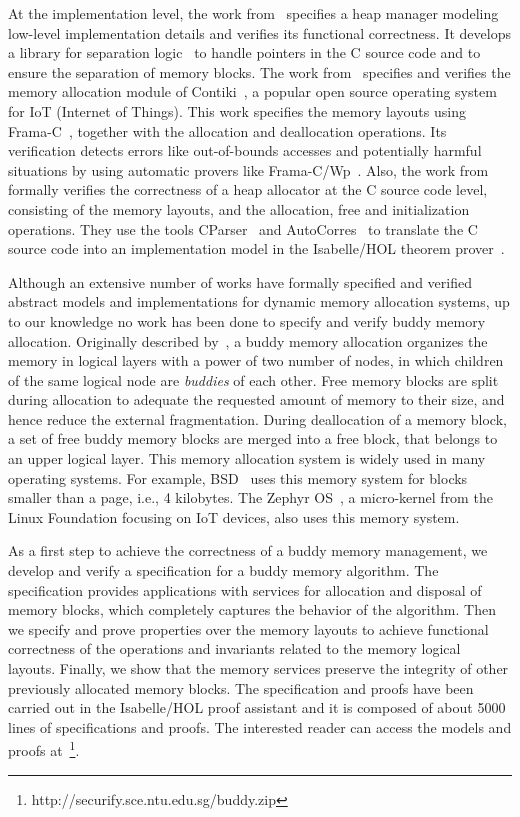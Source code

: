 At the implementation level, the work from~\cite{reg_marti} specifies a heap manager modeling low-level implementation details and verifies its functional correctness. It develops a library for separation logic~\cite{reg_reynolds} to handle pointers in the C source code and to ensure the separation of memory blocks. The work from~\cite{reg_mangano} specifies and verifies the memory allocation module of Contiki~\cite{reg_dunkers}, a popular open source operating system for IoT (Internet of Things). This work specifies the memory layouts using Frama-C~\cite{reg_kirchner}, together with the allocation and deallocation operations. Its verification detects errors like out-of-bounds accesses and potentially harmful situations by using automatic provers like Frama-C/Wp~\cite{reg_allan}. Also, the work from~\cite{reg_sahebolamri} formally verifies the correctness of a heap allocator at the C source code level, consisting of the memory layouts, and the allocation, free and initialization operations. They use the tools CParser~\cite{reg_tuch} and AutoCorres~\cite{reg_greenaway} to translate the C source code into an implementation model in the Isabelle/HOL theorem prover~\cite{reg_Isabelle/HOL}.

Although an extensive number of works have formally specified and verified abstract models and implementations for dynamic memory allocation systems, up to our knowledge no work has been done to specify and verify buddy memory allocation. Originally described by~\cite{reg_knowlton}, a buddy memory allocation organizes the memory in logical layers with a power of two number of nodes, in which children of the same logical node are \emph{buddies} of each other. Free memory blocks are split during allocation to adequate the requested amount of memory to their size, and hence reduce the external fragmentation. During deallocation of a memory block, a set of free buddy memory blocks are merged into a free block, that belongs to an upper logical layer. This memory allocation system is widely used in many operating systems. For example, BSD~\cite{reg_mckusick} uses this memory system for blocks smaller than a page, i.e., 4 kilobytes. The Zephyr OS~\cite{reg_zephyr}, a micro-kernel from the Linux Foundation focusing on IoT devices, also uses this memory system.

As a first step to achieve the correctness of a buddy memory management, we develop and verify a specification for a buddy memory algorithm. The specification provides applications with services for allocation and disposal of memory blocks, which completely captures the behavior of the algorithm. Then we specify and prove properties over the memory layouts to achieve functional correctness of the operations and invariants related to the memory logical layouts. Finally, we show that the memory services preserve the integrity of other previously allocated memory blocks. The specification and proofs have been carried out in the Isabelle/HOL proof assistant and it is composed of about 5000 lines of specifications and proofs. The interested reader can access the models and proofs at~\footnote{http://securify.sce.ntu.edu.sg/buddy.zip}.

